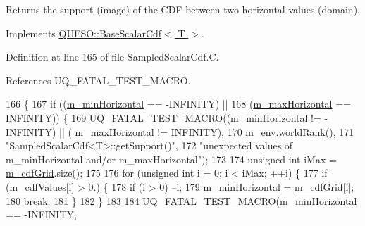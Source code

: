 Returns the support (image) of the C\-D\-F between two horizontal values (domain). 



Implements \hyperlink{class_q_u_e_s_o_1_1_base_scalar_cdf_a9684b285f88be8c2bafe4d2abd8a7447}{Q\-U\-E\-S\-O\-::\-Base\-Scalar\-Cdf$<$ T $>$}.



Definition at line 165 of file Sampled\-Scalar\-Cdf.\-C.



References U\-Q\-\_\-\-F\-A\-T\-A\-L\-\_\-\-T\-E\-S\-T\-\_\-\-M\-A\-C\-R\-O.


\begin{DoxyCode}
166 \{
167   \textcolor{keywordflow}{if} ((\hyperlink{class_q_u_e_s_o_1_1_base_scalar_cdf_ab54be9623cddb0671db458d05d63f0a7}{m\_minHorizontal} == -INFINITY) ||
168       (\hyperlink{class_q_u_e_s_o_1_1_base_scalar_cdf_a33beb9b7e610a4fe1458080593982d2e}{m\_maxHorizontal} ==  INFINITY)) \{
169     \hyperlink{_defines_8h_a56d63d18d0a6d45757de47fcc06f574d}{UQ\_FATAL\_TEST\_MACRO}((\hyperlink{class_q_u_e_s_o_1_1_base_scalar_cdf_ab54be9623cddb0671db458d05d63f0a7}{m\_minHorizontal} != -INFINITY) || (
      \hyperlink{class_q_u_e_s_o_1_1_base_scalar_cdf_a33beb9b7e610a4fe1458080593982d2e}{m\_maxHorizontal} != INFINITY),
170                         \hyperlink{class_q_u_e_s_o_1_1_base_scalar_cdf_a3caa986ae1ccef96a28b0365fb88c86c}{m\_env}.\hyperlink{class_q_u_e_s_o_1_1_base_environment_a78b57112bbd0e6dd0e8afec00b40ffa7}{worldRank}(),
171                         \textcolor{stringliteral}{"SampledScalarCdf<T>::getSupport()"},
172                         \textcolor{stringliteral}{"unexpected values of m\_minHorizontal and/or m\_maxHorizontal"});
173 
174     \textcolor{keywordtype}{unsigned} \textcolor{keywordtype}{int} iMax = \hyperlink{class_q_u_e_s_o_1_1_sampled_scalar_cdf_a58d6744bac9ce8d906839bf381517f4a}{m\_cdfGrid}.size();
175 
176     \textcolor{keywordflow}{for} (\textcolor{keywordtype}{unsigned} \textcolor{keywordtype}{int} i = 0; i < iMax; ++i) \{
177       \textcolor{keywordflow}{if} (\hyperlink{class_q_u_e_s_o_1_1_sampled_scalar_cdf_ab8cf649637f31cc75c9f676d5927c10f}{m\_cdfValues}[i] > 0.) \{
178         \textcolor{keywordflow}{if} (i > 0) --i;
179         \hyperlink{class_q_u_e_s_o_1_1_base_scalar_cdf_ab54be9623cddb0671db458d05d63f0a7}{m\_minHorizontal} = \hyperlink{class_q_u_e_s_o_1_1_sampled_scalar_cdf_a58d6744bac9ce8d906839bf381517f4a}{m\_cdfGrid}[i];
180         \textcolor{keywordflow}{break};
181       \}
182     \}
183 
184     \hyperlink{_defines_8h_a56d63d18d0a6d45757de47fcc06f574d}{UQ\_FATAL\_TEST\_MACRO}(\hyperlink{class_q_u_e_s_o_1_1_base_scalar_cdf_ab54be9623cddb0671db458d05d63f0a7}{m\_minHorizontal} == -INFINITY,

\end{DoxyCode}
